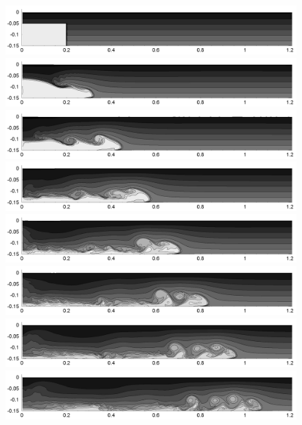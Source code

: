 \begin{figure}[htbp]
  \begin{center}    \includegraphics[scale=0.55]{../figures/Staggered/Fig9case/060518c-SSPRK35-dt-00375-280-120/01.png}    \includegraphics[scale=0.55]{../figures/Staggered/Fig9case/060518c-SSPRK35-dt-00375-280-120/02.png}
\includegraphics[scale=0.55]{../figures/Staggered/Fig9case/060518c-SSPRK35-dt-00375-280-120/03.png}
\includegraphics[scale=0.55]{../figures/Staggered/Fig9case/060518c-SSPRK35-dt-00375-280-120/04.png}    \includegraphics[scale=0.55]{../figures/Staggered/Fig9case/060518c-SSPRK35-dt-00375-280-120/05.png}
\includegraphics[scale=0.55]{../figures/Staggered/Fig9case/060518c-SSPRK35-dt-00375-280-120/06.png}
\includegraphics[scale=0.55]{../figures/Staggered/Fig9case/060518c-SSPRK35-dt-00375-280-120/07.png}    \includegraphics[scale=0.55]{../figures/Staggered/Fig9case/060518c-SSPRK35-dt-00375-280-120/08.png}

\end{center}
\end{figure}
